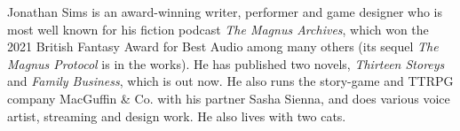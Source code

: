 Jonathan Sims is an award-winning writer, performer and game designer who is most well known for his fiction podcast \emph{The Magnus Archives}, which won the 2021 British Fantasy Award for Best Audio among many others (its sequel \emph{The Magnus Protocol} is in the works). He has published two novels, \emph{Thirteen Storeys} and \emph{Family Business}, which is out now. He also runs the story-game and TTRPG company MacGuffin \& Co. with his partner Sasha Sienna, and does various voice artist, streaming and design work. He also lives with two cats.
